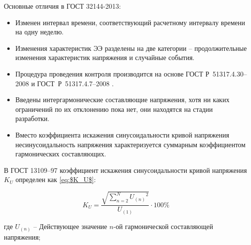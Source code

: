 Основные отличия в ГОСТ 32144-2013:
\begin{itemize}
	\item Изменен интервал времени, соответствующий расчетному интервалу времени на одну неделю.
	\item Изменения характеристик ЭЭ разделены на две категории – продолжительные изменения характеристик напряжения и случайные события.
	\item Процедура проведения контроля производится на основе ГОСТ Р~51317.4.30--2008 \cite{GOSTR51317.4.30-2008} и ГОСТ~Р~51317.4.7--2008 \cite{GOSTR51317.4.7-2008}.
	\item Введены интергармонические составляющие напряжения, хотя ни каких ограничений по их отклонению пока нет, они находятся на стадии разработки.
	\item Вместо коэффициента искажения синусоидальности кривой напряжения несинусоидальность напряжения характеризуется суммарным коэффициентом гармонических составляющих.
\end{itemize} 



В ГОСТ 13109--97 \cite{GOST13109-97} коэффициент искажения синусоидальности кривой напряжения $K_U$ определен как \eqref{eq:$K_U$}:

\begin{equation}
	\label{eq:$K_U$}
	K_U = \frac{\sqrt{\sum_{n=2}^N {U_{(n)}}^2}}{U_{(1)}}\cdot 100 \%
\end{equation}


где $U_{(n)}$ -- Действующее значение $n$-ой гармонической составляющей напряжения;

